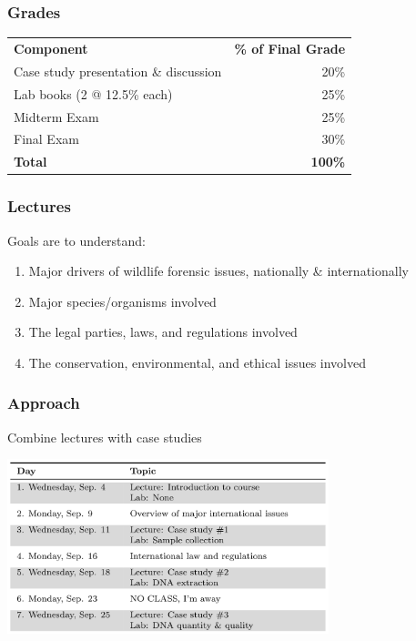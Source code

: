 \documentclass[10pt]{beamer}
\begin{document}
\begin{frame}[t]
\frametitle{Grades}
\vspace{0.5cm}

	\begin{center}
		\begin{tabular}{@{} l r}
			\toprule
			\textbf{Component} & \textbf{\% of Final Grade}\\
			\addlinespace
			\midrule
			Case study presentation \& discussion & 20\%\\
			\addlinespace
			Lab books (2 @ 12.5\% each) & 25\%\\
			\addlinespace
			Midterm Exam & 25\%\\
			\addlinespace
			Final Exam & 30\%\\
			\midrule
			\textbf{Total} & \textbf{100\%}\\
			\bottomrule
		\end{tabular}
	\end{center}
\end{frame}


\begin{frame}[t]
\frametitle{Lectures}
\vspace{0.5cm}

	Goals are to understand:
	
		\begin{enumerate}
			\item Major drivers of wildlife forensic issues, nationally \& internationally
			\item Major species/organisms involved
			\item The legal parties, laws, and regulations involved
			\item The conservation, environmental, and ethical issues involved
		\end{enumerate}
\end{frame}


\begin{frame}[t]
\frametitle{Approach}
\vspace{0.5cm}

 Combine lectures with case studies\\
 
 \vspace{0.5cm}
 
 	\begin{center}
		\includegraphics[width=0.7\textwidth]{figures/schedule.png}
	\end{center}
\end{frame}
\end{document}
